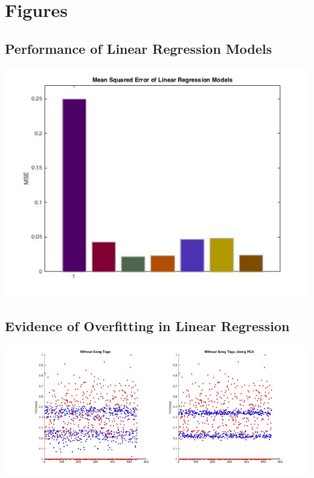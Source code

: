 \documentclass[12pt]{article}
\begin{document}
\section{Figures}
\label{sec:figures}

\subsection{Performance of Linear Regression Models}
\label{subsec:MSE}
\includegraphics[scale=.5]{images/lr/mse}

\subsection{Evidence of Overfitting in Linear Regression}
\label{subsec:overfitting}
\includegraphics[scale=.4]{images/lr/overfit}
\end{document}
